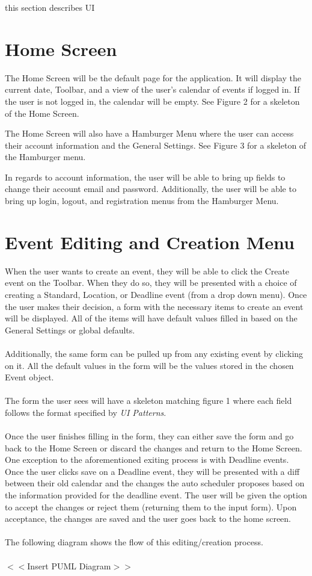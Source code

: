 \documentclass{scrreprt}
\begin{document}
this section describes UI

\section{Home Screen}

The Home Screen will be the default page for the application.  It will display the current date, Toolbar, and a view of the user's calendar of events if logged in.  If the user is not logged in, the calendar will be empty. See Figure 2 for a skeleton of the Home Screen.

The Home Screen will also have a Hamburger Menu where the user can access their account information and the General Settings.  See Figure 3 for a skeleton of the Hamburger menu.

In regards to account information, the user will be able to bring up fields to change their account email and password.  Additionally, the user will be able to bring up login, logout, and registration menus from the Hamburger Menu.

\section{Event Editing and Creation Menu}

When the user wants to create an event, they will be able to click the Create event on the Toolbar.  When they do so, they will be presented with a choice of creating a Standard, Location, or Deadline event (from a drop down menu). Once the user makes their decision, a form with the necessary items to create an event will be displayed.  All of the items will have default values filled in based on the General Settings or global defaults.
\\\\
Additionally, the same form can be pulled up from any existing event by clicking on  it.  All the default values in the form will be the values stored in the chosen Event object.
\\\\
The form the user sees will have a skeleton matching figure 1 where each field follows the format specified by \textit{UI Patterns}.
\\\\
Once the user finishes filling in the form, they can either save the form and go back to the Home Screen or discard the changes and return to the Home Screen.
\\
One exception to the aforementioned exiting process is with Deadline events.  Once the user clicks save on a Deadline event, they will be presented with a diff between their old calendar and the changes the auto scheduler proposes based on the information provided for the deadline event.  The user will be given the option to accept the changes or reject them (returning them to the input form).  Upon acceptance, the changes are saved and the user goes back to the home screen.
\\\\
The following diagram shows the flow of this editing/creation process.
\\\\
$<$$<$Insert PUML Diagram$>$$>$
\\\\
\end{document}
